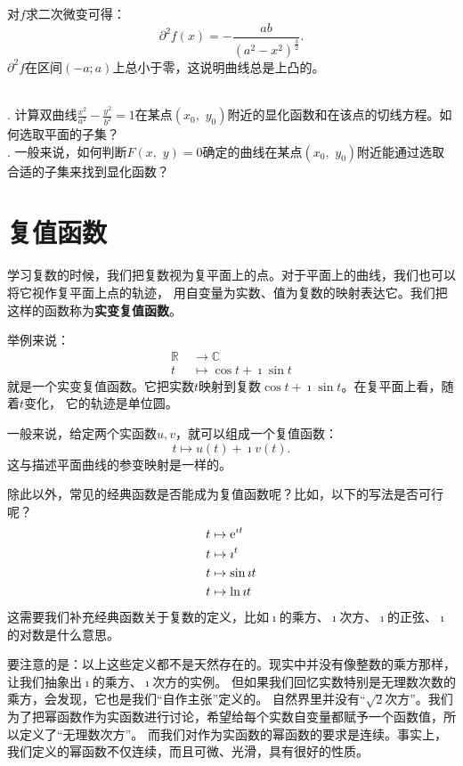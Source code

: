 \documentclass[12pt,UTF8]{ctexbook}
\begin{document}
对$f$求二次微变可得：
$$ \partial^2 f(x) = -\frac{ab}{(a^2 - x^2)^{\frac{3}{2}} }.$$
$\partial^2 f$在区间$(-a;a)$上总小于零，这说明曲线总是上凸的。

\begin{sk}
    \mbox{} \\
    . 计算双曲线$\frac{x^2}{a^2} - \frac{y^2}{b^2} = 1$在某点$(x_0,\,\,y_0)$附近的显化函数和在该点的切线方程。如何选取平面的子集？\\
    . 一般来说，如何判断$F(x,\,\, y) = 0$确定的曲线在某点$(x_0,\,\,y_0)$附近能通过选取合适的子集来找到显化函数？
\end{sk}

\section{复值函数}

学习复数的时候，我们把复数视为复平面上的点。对于平面上的曲线，我们也可以将它视作复平面上点的轨迹，
用自变量为实数、值为复数的映射表达它。我们把这样的函数称为\textbf{实变复值函数}。

举例来说：
\begin{align*}
    \mathbb{R} \;&\rightarrow \mathbb{C} \\
    t \;&\mapsto \cos{t} + \imath \sin{t}
\end{align*}
就是一个实变复值函数。它把实数$t$映射到复数$\cos{t} + \imath \sin{t}$。在复平面上看，随着$t$变化，
它的轨迹是单位圆。

一般来说，给定两个实函数$u,v$，就可以组成一个复值函数：
$$ t\mapsto u(t) + \imath v(t).$$
这与描述平面曲线的参变映射是一样的。

除此以外，常见的经典函数是否能成为复值函数呢？比如，以下的写法是否可行呢？
\begin{align*}
    t &\mapsto \mathrm{e}^{\imath t} \\
    t &\mapsto \imath^t \\
    t &\mapsto \sin{\imath t} \\
    t &\mapsto \ln{\imath t} 
\end{align*}
这需要我们补充经典函数关于复数的定义，比如$\imath$的乘方、$\imath$次方、$\imath$的正弦、$\imath$的对数是什么意思。

要注意的是：以上这些定义都不是天然存在的。现实中并没有像整数的乘方那样，让我们抽象出$\imath$的乘方、$\imath$次方的实例。
但如果我们回忆实数特别是无理数次数的乘方，会发现，它也是我们“自作主张”定义的。
自然界里并没有“$\sqrt{2}$次方”。我们为了把幂函数作为实函数进行讨论，希望给每个实数自变量都赋予一个函数值，所以定义了“无理数次方”。
而我们对作为实函数的幂函数的要求是连续。事实上，我们定义的幂函数不仅连续，而且可微、光滑，具有很好的性质。
\end{document}
